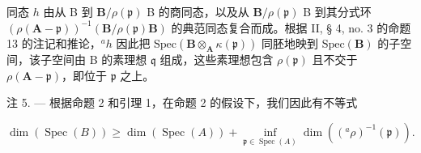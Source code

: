 同态 \(h\) 由从 B 到 \(\mathbf{B} / \rho(\mathfrak{p})\) B 的商同态，以及从 \(\mathbf{B} / \rho(\mathfrak{p})\) B 到其分式环 \((\rho(\mathbf{A} - \mathfrak{p}))^{-1}(\mathbf{B} / \rho(\mathfrak{p}) \mathbf{B})\) 的典范同态复合而成。根据 II, § 4, no. 3 的命题 13 的注记和推论，\(^a h\) 因此把 \(\text{Spec}(\mathbf{B} \otimes_{\mathbf{A}} \kappa(\mathfrak{p}))\) 同胚地映到 \(\text{Spec}(\mathbf{B})\) 的子空间，该子空间由 B 的素理想 \(\mathfrak{q}\) 组成，这些素理想包含 \(\rho(\mathfrak{p})\) 且不交于 \(\rho(\mathbf{A} - \mathfrak{p})\)，即位于 \(\mathfrak{p}\) 之上。

注 5. --- 根据命题 2 和引理 1，在命题 2 的假设下，我们因此有不等式

\[
\dim (\operatorname{Spec} (B)) \geqslant \dim (\operatorname{Spec} (A)) + \inf _ {\mathfrak {p} \in \operatorname{Spec} (A)} \dim \left(({}^{a}\rho)^{-1} (\mathfrak {p})\right).\tag{4}
\]

